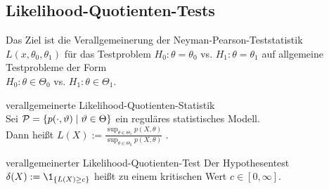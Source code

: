 \subsection{%
    Likelihood-Quotienten-Tests%
}

\begin{Bem}
    Das Ziel ist die Verallgemeinerung der Neyman-Pearson-Teststatistik $L(x, \theta_0, \theta_1)$
    für das Testproblem $H_0\colon \theta = \theta_0$ vs. $H_1\colon \theta = \theta_1$
    auf allgemeine Testprobleme der Form\\
    $H_0\colon \theta \in \Theta_0$ vs. $H_1\colon \theta \in \Theta_1$.
\end{Bem}

\begin{Def}{verallgemeinerte Likelihood-Quotienten-Statistik}\\
    Sei $\P = \{p(\cdot, \theta) \;|\; \theta \in \Theta\}$ ein reguläres statistisches Modell.\\
    Dann heißt $L(X) := \frac{\sup_{\theta \in \Theta_1} p(X, \theta)}
    {\sup_{\theta \in \Theta_0} p(X, \theta)}$
    .
\end{Def}

\begin{Def}{verallgemeinerter Likelihood-Quotienten-Test}
    Der Hypothesentest $\delta(X) := \1_{\{L(X) \ge c\}}$ heißt
     zu einem kritischen Wert
    $c \in [0, \infty]$.
\end{Def}

